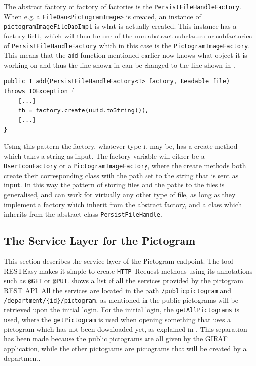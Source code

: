 The abstract factory or factory of factories is the \texttt{PersistFileHandleFactory}.
When e.g. a \texttt{FileDao<PictogramImage>} is created, an instance of \texttt{pictogramImageFileDaoImpl} is what is actually created.
This instance has a factory field, which will then be one of the non abstract subclasses or subfactories of \texttt{PersistFileHandleFactory} which in this case is the \texttt{PictogramImageFactory}.
This means that the \texttt{add} function mentioned earlier now knows what object it is working on and thus the line shown in  can be changed to the line shown in .

\begin{lstlisting}[float, floatplacement=h, caption={Trying to use a Type Parameter constructor, which Java cannot do.},label={lst:TypeParameterConstructorActual}]
public T add(PersistFileHandleFactory<T> factory, Readable file) throws IOException {
    [...]
    fh = factory.create(uuid.toString());
    [...]
}
\end{lstlisting}

Using this pattern the factory, whatever type it may be, has a create method which takes a string as input.
The factory variable will either be a \texttt{UserIconFactory} or a \texttt{PictogramImageFactory}, where the create methods both create their corresponding class with the path set to the string that is sent as input.
In this way the pattern of storing files and the paths to the files is generalised, and can work for virtually any other type of file, as long as they implement a factory which inherit from the abstract factory, and a class which inherits from the abstract class \texttt{PersistFileHandle}.

\subsection{The Service Layer for the Pictogram}\label{ssec:pictogram_service}
This section describes the service layer of the Pictogram endpoint.
The tool RESTEasy makes it simple to create \texttt{HTTP}--Request methods using its annotations such as \texttt{@GET} or \texttt{@PUT}.
 shows a list of all the services provided by the pictogram REST API.
All the services are located in the path \texttt{/publicpictogram} and \texttt{/department/\{id\}/pictogram}, as mentioned in  the public pictograms will be retrieved upon the initial login.
For the initial login, the \texttt{getAllPictograms} is used, where the \texttt{getPictogram} is used when opening something that uses a pictogram which has not been downloaded yet, as explained in .
This separation has been made because the public pictograms are all given by the GIRAF application, while the other pictograms are pictograms that will be created by a department.

